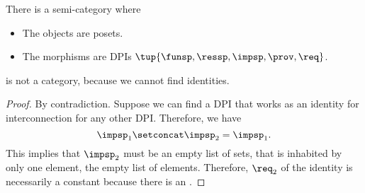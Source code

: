 \begin{definition}
  \label{def:DPIcat}
  There is a semi-category \DPI where
  \begin{itemize}
    \item The objects are posets.
    \item The morphisms are DPIs $\tup{\funsp,\ressp,\impsp,\prov,\req}$.
  \end{itemize}
\end{definition}

\begin{lemma}
\DPI is not a category, because we cannot find identities.
\end{lemma}
\begin{proof}
By contradiction. Suppose we can find a DPI that works as an identity for interconnection for any other DPI.
Therefore, we have
\begin{equation}
  \impsp_{1} \setconcat \impsp_{2} = \impsp_{1}.
\end{equation}
This implies that $\impsp_{2}$ must be an empty list of sets,  that is inhabited by only one element, the empty list of elements. Therefore, $\req_2$ of the identity is necessarily a constant because there is an .
\end{proof}




